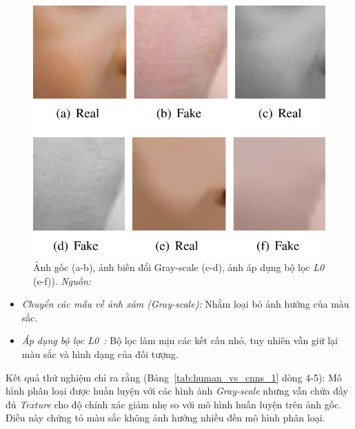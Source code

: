 %
%
\begin{figure}[ht!]
	\centering
	\includegraphics[width=0.8\linewidth]{Images/gray-scale-and-texture-1.png}
	\begin{minipage}{0.9\linewidth}
		\caption{Ảnh gốc (a-b), ảnh biến đổi Gray-scale (c-d), ảnh áp dụng bộ lọc \textit{L0} (e-f)). \textit{Nguồn: \cite{9157447}}}
		\label{fig:gray-scale-and-texture-1}
	\end{minipage}
\end{figure}
%
%
\begin{itemize}
	\item \textit{Chuyển các mẫu về ảnh xám (Gray-scale):} Nhằm loại bỏ ảnh hưởng của màu sắc.
	\item \textit{Áp dụng bộ lọc L0~\cite{10.1145/2070781.2024208}:} Bộ lọc làm mịn các kết cấu nhỏ, tuy nhiên vẫn giữ lại màu sắc và hình dạng của đối tượng.
\end{itemize}
%
%
Kết quả thử nghiệm chỉ ra rằng (Bảng~\ref{tab:human_vs_cnns_1} dòng 4-5): Mô hình phân loại được huấn luyện với các hình ảnh \textit{Gray-scale} nhưng vẫn chứa đầy đủ \textit{Texture} cho độ chính xác giảm nhẹ so với mô hình huấn luyện trên ảnh gốc. Điều này chứng tỏ màu sắc không ảnh hưởng nhiều đến mô hình phân loại.

